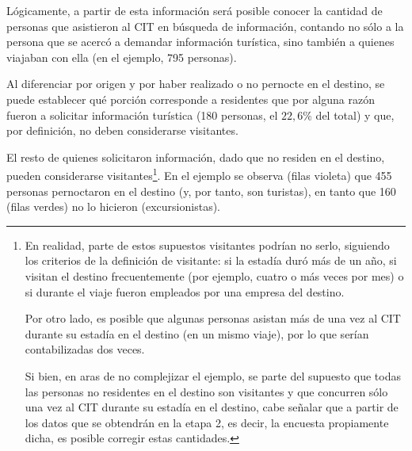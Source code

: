 \documentclass[
]{book}
\begin{document}
Lógicamente, a partir de esta información será posible conocer la cantidad de personas que asistieron al CIT en búsqueda de información, contando no sólo a la persona que se acercó a demandar información turística, sino también a quienes viajaban con ella (en el ejemplo, 795 personas).

Al diferenciar por origen y por haber realizado o no pernocte en el destino, se puede establecer qué porción corresponde a residentes que por alguna razón fueron a solicitar información turística (180 personas, el \(22,6\%\) del total) y que, por definición, no deben considerarse visitantes.

El resto de quienes solicitaron información, dado que no residen en el destino, pueden considerarse visitantes\footnote{En realidad, parte de estos supuestos visitantes podrían no serlo, siguiendo los criterios de la definición de visitante: si la estadía duró más de un año, si visitan el destino frecuentemente (por ejemplo, cuatro o más veces por mes) o si durante el viaje fueron empleados por una empresa del destino.

  Por otro lado, es posible que algunas personas asistan más de una vez al CIT durante su estadía en el destino (en un mismo viaje), por lo que serían contabilizadas dos veces.

  Si bien, en aras de no complejizar el ejemplo, se parte del supuesto que todas las personas no residentes en el destino son visitantes y que concurren sólo una vez al CIT durante su estadía en el destino, cabe señalar que a partir de los datos que se obtendrán en la etapa 2, es decir, la encuesta propiamente dicha, es posible corregir estas cantidades.}. En el ejemplo se observa (filas violeta) que 455 personas pernoctaron en el destino (y, por tanto, son turistas), en tanto que 160 (filas verdes) no lo hicieron (excursionistas).\\
\end{document}
